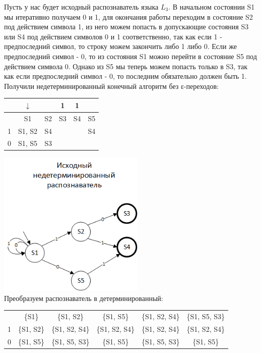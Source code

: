\documentclass[a4paper,14pt]{extarticle}
\begin{document}
\begin{enumerate}[1.]
\iffalse
Пусть у нас будет исходный распознаватель языка $L_3$. В начальном состоянии S1 мы итеративно 
получаем 0 и 1, для окончания работы переходим в состояние S2 под действием символа
1, из него можем попасть в допускающие состояния S3 или S4 под действием символов 0 и 1 соответственно, 
так как если 1 - предпоследний символ, то строку можем закончить либо 1 либо 0. 
Если же предпоследний символ - 0, то из состояния S1 можно перейти в состояние S5 
под действием символа 0. Однако из S5 мы теперь можем попасть только в S3, так как если предпоследний 
символ - 0, то последним обязательно должен быть 1. Получили недетерминированный конечный алгоритм
без ε-переходов:\\
\begin{tabular}{|c|c|c|c|c|c|}
    \hline
    & $\downarrow$ & & 1 & 1 & \\
    \hline
    & S1 & S2 & S3 & S4 & S5 \\
    \hline
    1 & S1, S2 & S4 & & & S4 \\
    \hline
    0 & S1, S5 & S3 & & & \\
    \hline
\end{tabular}
\includegraphics[width=70mm]{task3_non_determined}\\

Преобразуем распознаватель в детерминированный:\\
\begin{tabular}{|c|c|c|c|c|c|}
    \hline
    & & & & &\\
    \hline
    & \{S1\} & \{S1, S2\} & \{S1, S5\} & \{S1, S2, S4\} & \{S1, S5, S3\}\\
    \hline
    1 & \{S1, S2\} & \{S1, S2, S4\} & \{S1, S2, S4\} & \{S1, S2, S4\} & \{S1, S2, S4\}\\
    \hline
    0 & \{S1, S5\} & \{S1, S5, S3\} & \{S1, S5\} & \{S1, S5, S3\} & \{S1, S5\}\\
    \hline
\end{tabular} 


\end{enumerate}
\end{document}
